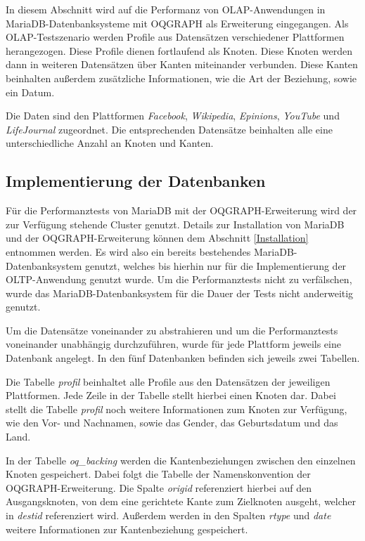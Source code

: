 In diesem Abschnitt wird auf die Performanz von OLAP-Anwendungen in MariaDB-Datenbanksysteme mit OQGRAPH als Erweiterung eingegangen. Als OLAP-Testszenario werden Profile aus Datensätzen verschiedener Plattformen herangezogen. Diese Profile dienen fortlaufend als Knoten. Diese Knoten werden dann in weiteren Datensätzen über Kanten miteinander verbunden. Diese Kanten beinhalten außerdem zusätzliche Informationen, wie die Art der Beziehung, sowie ein Datum.

Die Daten sind den Plattformen \emph{Facebook}, \emph{Wikipedia}, \emph{Epinions}, \emph{YouTube} und \emph{LifeJournal} zugeordnet. Die entsprechenden Datensätze beinhalten alle eine unterschiedliche Anzahl an Knoten und Kanten.

\subsection{Implementierung der Datenbanken}

Für die Performanztests von MariaDB mit der OQGRAPH-Erweiterung wird der zur Verfügung stehende Cluster genutzt. Details zur Installation von MariaDB und der OQGRAPH-Erweiterung können dem Abschnitt \ref{Installation} entnommen werden. Es wird also ein bereits bestehendes MariaDB-Datenbanksystem genutzt, welches bis hierhin nur für die Implementierung der OLTP-Anwendung genutzt wurde. Um die Performanztests nicht zu verfälschen, wurde das MariaDB-Datenbanksystem für die Dauer der Tests nicht anderweitig genutzt.

Um die Datensätze voneinander zu abstrahieren und um die Performanztests voneinander unabhängig durchzuführen, wurde für jede Plattform jeweils eine Datenbank angelegt. In den fünf Datenbanken befinden sich jeweils zwei Tabellen.

Die Tabelle \emph{profil} beinhaltet alle Profile aus den Datensätzen der jeweiligen Plattformen. Jede Zeile in der Tabelle stellt hierbei einen Knoten dar. Dabei stellt die Tabelle \emph{profil} noch weitere Informationen zum Knoten zur Verfügung, wie den Vor- und Nachnamen, sowie das Gender, das Geburtsdatum und das Land.

In der Tabelle \emph{oq\_backing} werden die Kantenbeziehungen zwischen den einzelnen Knoten gespeichert. Dabei folgt die Tabelle der Namenskonvention der OQGRAPH-Erweiterung. Die Spalte \emph{origid} referenziert hierbei auf den Ausgangsknoten, von dem eine gerichtete Kante zum Zielknoten ausgeht, welcher in \emph{destid} referenziert wird. Außerdem werden in den Spalten \emph{rtype} und \emph{date} weitere Informationen zur Kantenbeziehung gespeichert.

